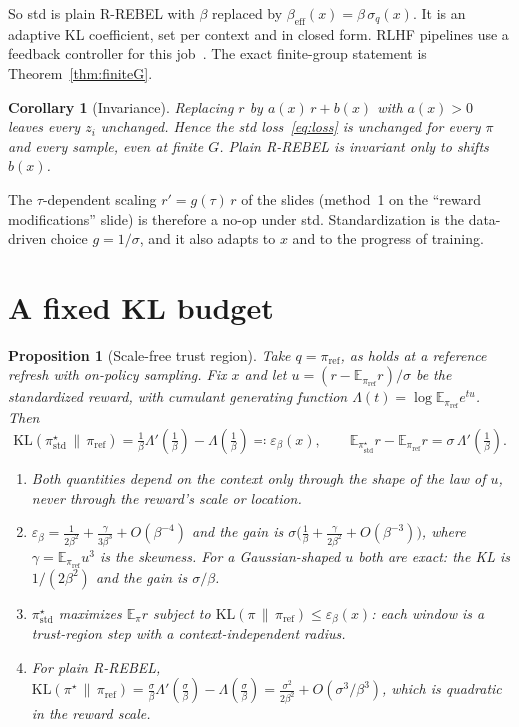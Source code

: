 \documentclass[11pt]{article}
\newtheorem{proposition}[theorem]{Proposition}
\newtheorem{corollary}[theorem]{Corollary}
\theoremstyle{definition}
\theoremstyle{remark}
\newcommand{\E}{\mathbb{E}}
\newcommand{\KL}{\mathrm{KL}}
\newcommand{\pref}{\pi_{\mathrm{ref}}}
\newcommand{\1}{\mathbb{1}}
\newcommand{\rr}{R-REBEL}
\begin{document}
So std is plain \rr{} with $\beta$ replaced by $\beta_{\mathrm{eff}}(x)=\beta\,\sigma_q(x)$.
It is an adaptive KL coefficient, set per context and in closed form. RLHF
pipelines use a feedback controller for this job~\cite{ziegler}. The exact
finite-group statement is Theorem~\ref{thm:finiteG}.

\begin{corollary}[Invariance]\label{cor:invariance}
Replacing $r$ by $a(x)\,r+b(x)$ with $a(x)>0$ leaves every $z_i$ unchanged. Hence the
std loss~\eqref{eq:loss} is unchanged for every $\pi$ and every sample, even at
finite $G$. Plain \rr{} is invariant only to shifts $b(x)$.
\end{corollary}

The $\tau$-dependent scaling $r'=g(\tau)\,r$ of the slides (method~1 on the ``reward
modifications'' slide) is therefore a no-op under std. Standardization is the
data-driven choice $g=1/\sigma$, and it also adapts to $x$ and to the progress of
training.

\section{A fixed KL budget}\label{sec:budget}

\begin{proposition}[Scale-free trust region]\label{prop:budget}
Take $q=\pref$, as holds at a reference refresh with on-policy sampling. Fix $x$ and
let $u=(r-\E_{\pref}r)/\sigma$ be the standardized reward, with cumulant generating
function $\Lambda(t)=\log\E_{\pref}e^{tu}$. Then
\[
  \KL(\pi^\star_{\mathrm{std}}\,\|\,\pref)=\tfrac1\beta\Lambda'(\tfrac1\beta)-\Lambda(\tfrac1\beta)\eqqcolon\varepsilon_\beta(x),
  \qquad
  \E_{\pi^\star_{\mathrm{std}}}r-\E_{\pref}r=\sigma\,\Lambda'(\tfrac1\beta).
\]
\begin{enumerate}[label=(\roman*),itemsep=1pt,topsep=2pt]
\item Both quantities depend on the context only through the \emph{shape} of the
law of $u$, never through the reward's scale or location.
\item $\varepsilon_\beta=\frac{1}{2\beta^2}+\frac{\gamma}{3\beta^3}+O(\beta^{-4})$
and the gain is $\sigma\bigl(\frac1\beta+\frac{\gamma}{2\beta^2}+O(\beta^{-3})\bigr)$,
where $\gamma=\E_{\pref}u^3$ is the skewness. For a Gaussian-shaped $u$ both are
exact: the KL is $1/(2\beta^2)$ and the gain is $\sigma/\beta$.
\item $\pi^\star_{\mathrm{std}}$ maximizes $\E_\pi r$ subject to
$\KL(\pi\,\|\,\pref)\le\varepsilon_\beta(x)$: each window is a \emph{trust-region}
step with a context-independent radius.
\item For plain \rr{}, $\KL(\pi^\star\,\|\,\pref)=\frac{\sigma}{\beta}\Lambda'(\frac{\sigma}{\beta})-\Lambda(\frac{\sigma}{\beta})
=\frac{\sigma^2}{2\beta^2}+O(\sigma^3/\beta^3)$, which is quadratic in the reward scale.
\end{enumerate}
\end{proposition}
\end{document}
